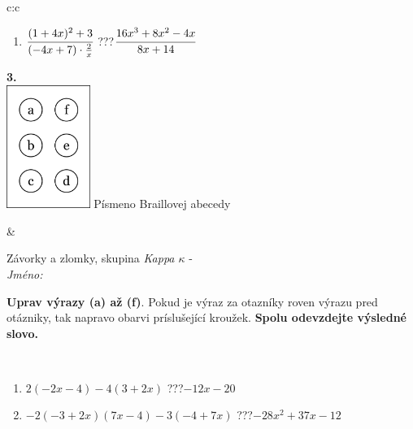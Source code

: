 \documentclass[10pt]{report}
\begin{document}
\begin{tabular}{c:c}
\begin{minipage}[c][104.5mm][t]{0.5\linewidth}
\begin{center}
\begin{minipage}{0.79\linewidth}
\begin{center}
\begin{varwidth}{\linewidth}
\begin{enumerate}
\item $\cfrac{(1+4x)^2+3}{(-4x+7)\cdot\frac{2}{x}}$\quad \dotfill\; ???\;\dotfill \quad $\cfrac{16x^3+8x^2-4x}{8x+14}$
\end{enumerate}
\end{varwidth}
\end{center}
\end{minipage}
\begin{minipage}{0.20\linewidth}
\begin{center}
{\Huge\bfseries 3.} \\[2mm]
\includegraphics[height=40mm]{../images/braille.png}
{\small Písmeno Braillovej abecedy}
\end{center}
\end{minipage}
\end{center}
\end{minipage}
&
\begin{minipage}[c][104.5mm][t]{0.5\linewidth}
\begin{center}
\vspace{7mm}
{\huge Závorky a zlomky, skupina \textit{Kappa $\kappa$} -}\\[5mm]
\textit{Jméno:}\phantom{xxxxxxxxxxxxxxxxxxxxxxxxxxxxxxxxxxxxxxxxxxxxxxxxxxxxxxxxxxxxxxxxx}\\[5mm]
\begin{minipage}{0.95\linewidth}
\begin{center}
\textbf{Uprav výrazy (a) až (f)}. Pokud je výraz za otazníky roven výrazu pred otázniky, tak napravo obarvi príslušející kroužek. \textbf{Spolu odevzdejte výsledné slovo.}
\end{center}
\end{minipage}
\\[1mm]
\begin{minipage}{0.79\linewidth}
\begin{center}
\begin{varwidth}{\linewidth}
\begin{enumerate}
\normalsize
\item $2(-2x-4)-4(3+2x)$\quad \dotfill\; ???\;\dotfill \quad $-12x-20$
\item $-2(-3+2x)(7x-4)-3(-4+7x)$\quad \dotfill\; ???\;\dotfill \quad $-28x^2+37x-12$

\end{enumerate}
\end{varwidth}
\end{center}
\end{minipage}
\end{center}
\end{minipage}
\end{tabular}
\end{document}
